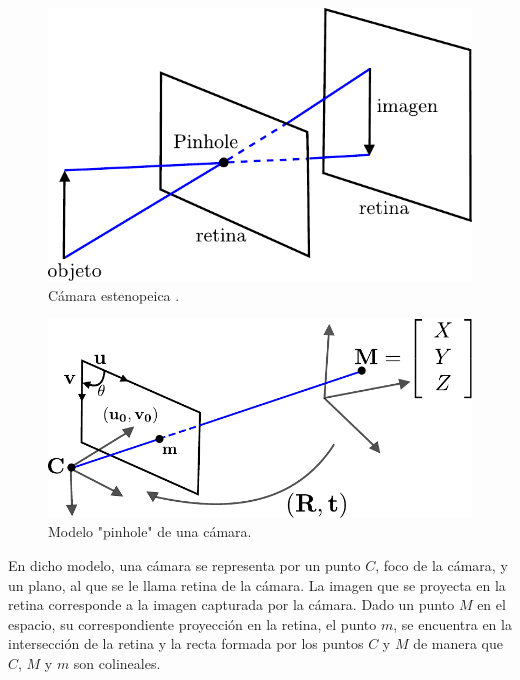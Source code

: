 \begin{figure}[ht!]
\begin{center}
\includegraphics[scale=0.5]{img/calibracion/pinhole_camara}
\end{center}
\caption{Cámara estenopeica .\cite{faugeras_libro}}
\label{pinhole_camara}
\end{figure}



\begin{figure}[ht!]
\begin{center}
\includegraphics[scale=0.5]{img/calibracion/pinhole_modelo}
\end{center}
\caption{Modelo "pinhole" de una cámara.\cite{zhang_libro}}
\label{pinhole_modelo}
\end{figure}

En dicho modelo, una cámara se representa por un punto $C$, foco de la cámara, y un plano, al  que se le llama retina de la cámara. La imagen que se proyecta en la retina corresponde a la imagen capturada por la cámara. Dado un punto $M$ en el espacio, su correspondiente proyección en la retina, el punto $m$, se encuentra en la intersección de la retina y la recta formada por los puntos $C$ y $M$ de manera que $C$, $M$ y $m$ son colineales.\\ 




